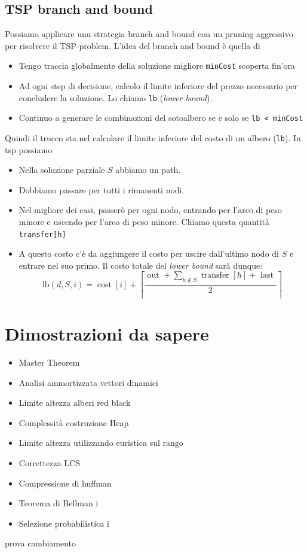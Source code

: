 \subsection{TSP branch and bound}
Possiamo applicare una strategia branch and bound con un pruning aggressivo per risolvere il TSP-problem.
L'idea del branch and bound è quella di
\begin{itemize}
	\item Tengo traccia globalmente della soluzione migliore \verb|minCost| scoperta fin'ora
	\item Ad ogni step di decisione, calcolo il limite inferiore del prezzo necessario per concludere la soluzione. Lo chiamo \verb|lb| (\textit{lower bound}).
	\item Continuo a generare le combinazioni del sotoalbero se e solo se \verb|lb < minCost|
\end{itemize}
Quindi il trucco sta nel calcolare il limite inferiore del costo di un albero (\verb|lb|). In tsp possiamo
\begin{itemize}
	\item Nella soluzione parziale $ S $ abbiamo un path.
	\item Dobbiamo passare per tutti i rimanenti nodi.
	\item Nel migliore dei casi, passerò per ogni nodo, entrando per l'arco di peso minore e uscendo per l'arco di peso minore. Chiamo questa quantità \verb|transfer[h]|
	\item A questo costo c'è da aggiungere il costo per uscire dall'ultimo nodo di $ S $ e entrare nel suo primo. Il costo totale del \textit{lower bound} sarà dunque:
	      \[
		      \mathrm{lb}(d, S, i)=\operatorname{cost}[i]+\left\lceil\frac{\text { out }+\sum_{h \notin S} \operatorname{transfer}[h]+\text { last }}{2}\right\rceil
	      \]
\end{itemize}
\section{Dimostrazioni da sapere}
\begin{itemize}
	\item Master Theorem
	\item Analisi ammortizzata vettori dinamici
	\item Limite altezza alberi red black
	\item Complessità costruzione Heap
	\item Limite altezza utilizzando euristica sul rango
	\item Correttezza LCS
	\item Compressione di huffman
	\item Teorema di Bellman
	      i
	\item Selezione probabilistica
	      i
\end{itemize}

prova cambiamento


